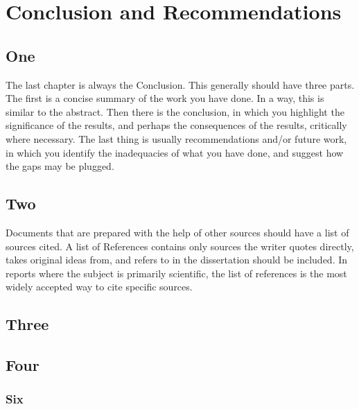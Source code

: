 
\chapter{Conclusion and Recommendations}
\begin{spacing}{1.5}
\setlength{\parskip}{0.3in}

\section{One}

The last chapter is always the Conclusion. This generally should have three parts. The first is a concise summary of the work you have done. In a way, this is similar to the abstract. Then there is the conclusion, in which you highlight the significance of the results, and perhaps the consequences of the results, critically where necessary. The last thing is usually recommendations and/or future work, in which you identify the inadequacies of what you have done, and suggest how the gaps may be plugged.

\section{Two}

Documents that are prepared with the help of other sources should have a list of sources cited. A list of References contains only sources the writer quotes directly, takes original ideas from, and refers to in the dissertation should be included. In reports where the subject is primarily scientific, the list of references is the most widely accepted way to cite specific sources.

\section{Three}

\section{Four}

\subsection{Six}


\end{spacing}
\newpage
